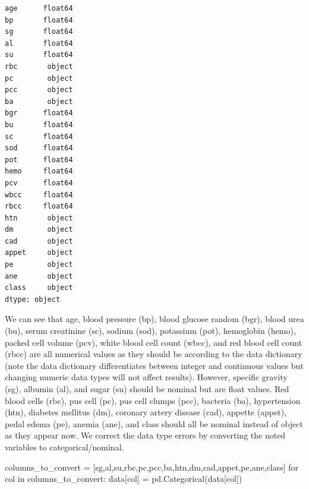 \documentclass[
  11pt,
  letterpaper,
  DIV=11,
  numbers=noendperiod]{scrartcl}
\newenvironment{Shaded}{\begin{snugshade}}{\end{snugshade}}
\newcommand{\ControlFlowTok}[1]{\textcolor[rgb]{0.00,0.23,0.31}{#1}}
\newcommand{\KeywordTok}[1]{\textcolor[rgb]{0.00,0.23,0.31}{#1}}
\newcommand{\NormalTok}[1]{\textcolor[rgb]{0.00,0.23,0.31}{#1}}
\newcommand{\OperatorTok}[1]{\textcolor[rgb]{0.37,0.37,0.37}{#1}}
\newcommand{\StringTok}[1]{\textcolor[rgb]{0.13,0.47,0.30}{#1}}
\begin{document}
\begin{verbatim}
age      float64
bp       float64
sg       float64
al       float64
su       float64
rbc       object
pc        object
pcc       object
ba        object
bgr      float64
bu       float64
sc       float64
sod      float64
pot      float64
hemo     float64
pcv      float64
wbcc     float64
rbcc     float64
htn       object
dm        object
cad       object
appet     object
pe        object
ane       object
class     object
dtype: object
\end{verbatim}

We can see that age, blood pressure (bp), blood glucose random (bgr),
blood urea (bu), serum creatinine (sc), sodium (sod), potassium (pot),
hemoglobin (hemo), packed cell volume (pcv), white blood cell count
(wbcc), and red blood cell count (rbcc) are all numerical values as they
should be according to the data dictionary (note the data dictionary
differentiates between integer and continuous values but changing
numeric data types will not affect results). However, specific gravity
(sg), albumin (al), and sugar (su) should be nominal but are float
values. Red blood cells (rbc), pus cell (pc), pus cell clumps (pcc),
bacteria (ba), hypertension (htn), diabetes mellitus (dm), coronary
artery disease (cad), appette (appet), pedal edema (pe), anemia (ane),
and class should all be nominal instead of object as they appear now. We
correct the data type errors by converting the noted variables to
categorical/nominal.

\begin{Shaded}
\begin{Highlighting}[]
\NormalTok{columns\_to\_convert }\OperatorTok{=}\NormalTok{ [}\StringTok{\textquotesingle{}sg\textquotesingle{}}\NormalTok{,}\StringTok{\textquotesingle{}al\textquotesingle{}}\NormalTok{,}\StringTok{\textquotesingle{}su\textquotesingle{}}\NormalTok{,}\StringTok{\textquotesingle{}rbc\textquotesingle{}}\NormalTok{,}\StringTok{\textquotesingle{}pc\textquotesingle{}}\NormalTok{,}\StringTok{\textquotesingle{}pcc\textquotesingle{}}\NormalTok{,}\StringTok{\textquotesingle{}ba\textquotesingle{}}\NormalTok{,}\StringTok{\textquotesingle{}htn\textquotesingle{}}\NormalTok{,}\StringTok{\textquotesingle{}dm\textquotesingle{}}\NormalTok{,}\StringTok{\textquotesingle{}cad\textquotesingle{}}\NormalTok{,}\StringTok{\textquotesingle{}appet\textquotesingle{}}\NormalTok{,}\StringTok{\textquotesingle{}pe\textquotesingle{}}\NormalTok{,}\StringTok{\textquotesingle{}ane\textquotesingle{}}\NormalTok{,}\StringTok{\textquotesingle{}class\textquotesingle{}}\NormalTok{]}
\ControlFlowTok{for}\NormalTok{ col }\KeywordTok{in}\NormalTok{ columns\_to\_convert:}
\NormalTok{    data[col] }\OperatorTok{=}\NormalTok{ pd.Categorical(data[col])}
\end{Highlighting}
\end{Shaded}
\end{document}
